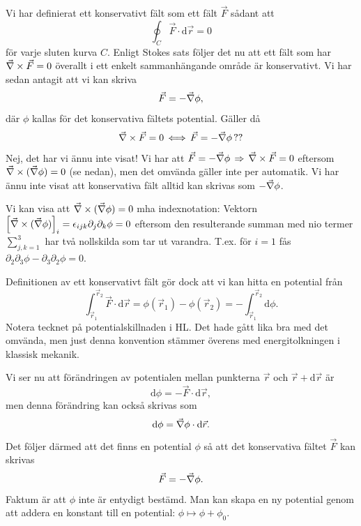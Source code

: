 \documentclass[%
oneside,                 %
final,                   %
10pt]{article}
\newenvironment{notice_mdfboxadmon}[1][]{
\begin{notice_mdfboxmdframed}[frametitle=#1]
}
{
\end{notice_mdfboxmdframed}
}
\begin{document}
Vi har definierat ett konservativt fält som ett fält $\vec{F}$ sådant att
\begin{equation}
  \oint_C \vec{F}\cdot \mbox{d}\vec{r} = 0
\end{equation}
för varje sluten kurva $C$.  Enligt Stokes sats följer det nu att ett fält som har $\vec{\nabla} \times \vec{F} = 0$ överallt i ett enkelt sammanhängande område är konservativt. Vi har sedan antagit att vi kan skriva
\begin{equation}
\vec{F} = - \vec{\nabla} \phi,
\end{equation}
där $\phi$ kallas för det konservativa fältets potential. Gäller då 
$$
\vec{\nabla} \times \vec{F} = 0 \, \Longleftrightarrow \, \vec{F} = - \vec{\nabla} \phi \, ??
$$
Nej, det har vi ännu inte visat! Vi har att $\vec{F} = - \vec{\nabla} \phi \, \Rightarrow \, \vec{\nabla} \times \vec{F} = 0 $ eftersom $\vnabla \times ( \vnabla \phi) = 0$ (se nedan), men det omvända gäller inte per automatik. Vi har ännu inte visat att konservativa fält alltid kan skrivas som $-\vec{\nabla} \phi$.


\begin{notice_mdfboxadmon}[Bevis av $\vnabla \times ( \vnabla \phi) = 0$ mha indexnotation]
Vi kan visa att $\vnabla \times ( \vnabla \phi) = 0$ mha indexnotation: Vektorn $\left[ \vec{\nabla} \times ( \vec{\nabla} \phi) \right]_i = \epsilon_{ijk} \partial_j \partial_k \phi = 0$ eftersom den resulterande summan med nio termer $\sum_{j,k=1}^3$ har två nollskilda som tar ut varandra. T.ex. för $i=1$ fås $\partial_2\partial_3 \phi - \partial_3\partial_2 \phi = 0$.
\end{notice_mdfboxadmon} %



Definitionen av ett konservativt fält gör dock att vi kan hitta en potential från
\begin{equation}
  \int_{\vec{r}_1}^{\vec{r}_2} \vec{F} \cdot \mbox{d} \vec{r} = \phi\left( \vec{r}_1 \right) - \phi\left( \vec{r}_2 \right) = - \int_{\vec{r}_1}^{\vec{r}_2} \mbox{d} \phi.
\end{equation}
Notera tecknet på potentialskillnaden i HL. Det hade gått lika bra med det omvända, men just denna konvention stämmer överens med energitolkningen i klassisk mekanik.

Vi ser nu att förändringen av potentialen mellan punkterna $\vec{r}$ och $\vec{r} + \mbox{d}\vec{r}$ är
\begin{equation}
  \mbox{d}\phi = -\vec{F}\cdot \mbox{d}\vec{r},
\end{equation}
men denna förändring kan också skrivas som
\begin{equation}
  \mbox{d}\phi = \vec{\nabla} \phi \cdot \mbox{d}\vec{r}.
\end{equation}
Det följer därmed att det finns en potential $\phi$ så att det konservativa fältet $\vec{F}$ kan skrivas
\begin{equation}
  \vec{F} = -\vec{\nabla} \phi.
\end{equation}
Faktum är att $\phi$ inte är entydigt bestämd.  Man kan skapa en ny potential genom att addera en konstant till en potential: $\phi \mapsto \phi + \phi_0$.
\end{document}
